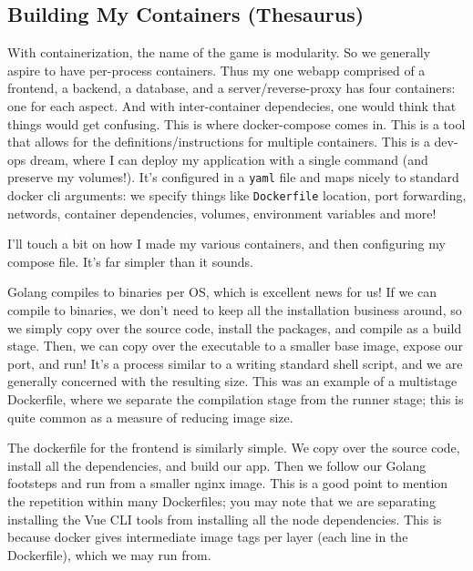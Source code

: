 \documentclass[11pt, twoside, reqno]{book}
\begin{document}
\subsection{Building My Containers (Thesaurus)}

With containerization, the name of the game is modularity. So we generally aspire to have per-process containers. Thus my one webapp comprised of a frontend, a backend, a database, and a server/reverse-proxy has four containers: one for each aspect. And with inter-container dependecies, one would think that things would get confusing. This is where docker-compose comes in. This is a tool that allows for the definitions/instructions for multiple containers. This is a dev-ops dream, where I can deploy my application with a single command (and preserve my volumes!). It's configured in a \texttt{yaml} file and maps nicely to standard docker cli arguments: we specify things like \texttt{Dockerfile} location, port forwarding, networds, container dependencies, volumes, environment variables and more!

I'll touch a bit on how I made my various containers, and then configuring my compose file. It's far simpler than it sounds.

\label{Go Backend Dockerfile}

Golang compiles to binaries per OS, which is excellent news for us! If we can compile to binaries, we don't need to keep all the installation business around, so we simply copy over the source code, install the packages, and compile as a build stage. Then, we can copy over the executable to a smaller base image, expose our port, and run! It's a process similar to a writing standard shell script, and we are generally concerned with the resulting size. This was an example of a multistage Dockerfile, where we separate the compilation stage from the runner stage; this is quite common as a measure of reducing image size.

\label{Vue Frontend Dockerfile}

The dockerfile for the frontend is similarly simple. We copy over the source code, install all the dependencies, and build our app. Then we follow our Golang footsteps and run from a smaller nginx image. This is a good point to mention the repetition within many Dockerfiles; you may note that we are separating installing the Vue CLI tools from installing all the node dependencies. This is because docker gives intermediate image tags per layer (each line in the Dockerfile), which we may run from.
\end{document}

